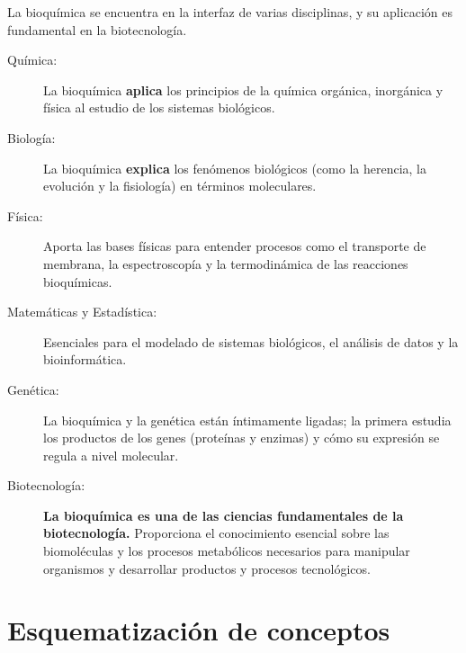 La bioquímica se encuentra en la interfaz de varias disciplinas, y su aplicación es fundamental en la biotecnología.

\begin{description}
    \item[Química:] La bioquímica \textbf{aplica} los principios de la química orgánica, inorgánica y física al estudio de los sistemas biológicos.
    \item[Biología:] La bioquímica \textbf{explica} los fenómenos biológicos (como la herencia, la evolución y la fisiología) en términos moleculares.
    \item[Física:] Aporta las bases físicas para entender procesos como el transporte de membrana, la espectroscopía y la termodinámica de las reacciones bioquímicas.
    \item[Matemáticas y Estadística:] Esenciales para el modelado de sistemas biológicos, el análisis de datos y la bioinformática.
    \item[Genética:] La bioquímica y la genética están íntimamente ligadas; la primera estudia los productos de los genes (proteínas y enzimas) y cómo su expresión se regula a nivel molecular.
    \item[Biotecnología:] \textbf{La bioquímica es una de las ciencias fundamentales de la biotecnología.} Proporciona el conocimiento esencial sobre las biomoléculas y los procesos metabólicos necesarios para manipular organismos y desarrollar productos y procesos tecnológicos.
\end{description}


\section{Esquematización de conceptos}

